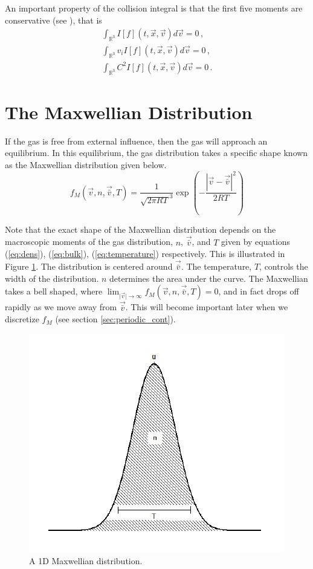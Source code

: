 \documentclass[12pt]{CSUNthesis}
\newcommand{\bulkv}{\vec{\bar{v}}} %
\begin{document}
An important property of the collision integral is that the first five moments are conservative (see \cite{Kremer2010}), that is
\begin{equation}
\label{eq:I_conservative}
\begin{split}
	\int_{\mathbb{R}^3}  I[f](t,\vec{x},\vec{v}) d\vec{v} = 0\, ,  \\
	\int_{\mathbb{R}^3} v_i I[f](t,\vec{x},\vec{v}) d\vec{v} = 0\, ,  \\
	\int_{\mathbb{R}^3} C^2 I[f](t,\vec{x},\vec{v}) d\vec{v} = 0 \, .
\end{split}
\end{equation}

\section{The Maxwellian Distribution}

If the gas is free from external influence, then the gas will approach an equilibrium. In this equilibrium, the gas distribution takes a specific shape known as the Maxwellian distribution given below.
\begin{equation}
\label{eq:maxwellian}
f_M(\vec{v},n,\vec{\bar{v}},T) = \frac{1}{\sqrt{2 \pi R T}^3} \exp\left( -\frac{ |\vec{v} - \vec{\bar{v}}|^2}{2RT} \right)
\end{equation} 
	
Note that the exact shape of the Maxwellian distribution depends on the macroscopic moments of the gas distribution, $n$, $\vec{\bar{v}}$, and $T$ given by equations (\ref{eq:dens}), (\ref{eq:bulk}), (\ref{eq:temperature}) respectively. This is illustrated in Figure \ref{fig:1d_maxwellian}. The distribution is centered around $\bulkv$. The temperature, $T$, controls the width of the distribution. $n$ determines the area under the curve. 
The Maxwellian takes a bell shaped, where $\lim_{\lvert \vec{v} \lvert \rightarrow \infty} f_M(\vec{v},n, \vec{\bar{v}}, T) = 0 $, and in fact drops off rapidly as we move away from $\vec{\bar{v}}$. This will become important later when we discretize $f_M$ (see section \ref{sec:periodic_cont}).
\begin{figure}[h]
\centering
\includegraphics[scale=.5]{1D_Maxwellian}
\caption{A 1D Maxwellian distribution. }
\label{fig:1d_maxwellian}
\end{figure}
\end{document}
